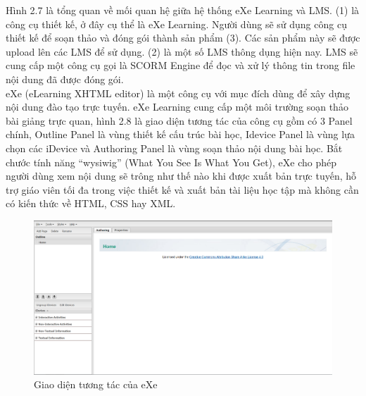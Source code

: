 \newpage

Hình 2.7 là tổng quan về mối quan hệ giữa hệ thống eXe Learning và LMS. (1) là công cụ thiết kế, ở đây cụ thể là eXe Learning. Người dùng sẽ sử dụng công cụ thiết kế để soạn thảo và đóng gói thành sản phẩm (3). Các sản phẩm này sẽ được upload lên các LMS để sử dụng. (2) là một số LMS thông dụng hiện nay. LMS sẽ cung cấp một công cụ gọi là SCORM Engine để đọc và xử lý thông tin trong file nội dung đã được đóng gói.\\

eXe (eLearning XHTML editor) là một công cụ với mục đích dùng để xây dựng nội dung đào tạo trực tuyến. eXe Learning cung cấp một môi trường soạn thảo bài giảng trực quan, hình 2.8 là giao diện tương tác của công cụ gồm có 3 Panel chính, Outline Panel là vùng thiết kế cấu trúc bài học, Idevice Panel là vùng lựa chọn các iDevice và Authoring Panel là vùng soạn thảo nội dung bài học. Bắt chước tính năng “wysiwig” (What You See Is What You Get), eXe cho phép người dùng xem nội dung sẽ trông như thế nào khi được xuất bản trực tuyến, hỗ trợ giáo viên tối đa trong việc thiết kế và xuất bản tài liệu học tập mà không cần có kiến thức về HTML, CSS hay XML. \\

\begin{center}
	\begin{figure}[htp]
		\begin{center}
			\includegraphics[width=15cm]{Chapter2/Pictures/picture28.png}
		\end{center}
		\caption{Giao diện tương tác của eXe}
		\label{refpicture28}
	\end{figure}
\end{center}	

